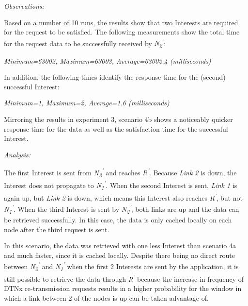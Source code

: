 \documentclass[a4paper,12pt]{report}      %
\begin{document}
\vspace*{1\baselineskip}\noindent\emph{Observations:}

Based on a number of 10 runs, the results show that two Interests are required for the request to be
satisfied. The following measurements show the total time for the request data to be successfully
received by \emph{N\textsubscript{2}\textsuperscript{'}}:

\begin{center}\textsl{Minimum=63002, Maximum=63003, Average=63002.4 (milliseconds)}\end{center}

In addition, the following times identify the response time for the (second) successful Interest:

\begin{center}\textsl{Minimum=1, Maximum=2, Average=1.6 (milliseconds)}\end{center}

Mirroring the results in experiment 3, scenario 4b shows a noticeably quicker response time for the data as well as the satisfaction time for the successful Interest.

\vspace*{1\baselineskip}\noindent\emph{Analysis:}

The first Interest is sent from \emph{N\textsubscript{2}\textsuperscript{'}} and reaches \emph{R\textsuperscript{'}}. Because \emph{Link 2} is down, the Interest does not propagate to \emph{N\textsubscript{1}\textsuperscript{'}}. When the second Interest is sent, \emph{Link 1} is again up, but \emph{Link 2} is down, which means this Interest also reaches \emph{R\textsuperscript{'}}, but not \emph{N\textsubscript{1}\textsuperscript{'}}. When the third Interest is sent by \emph{N\textsubscript{2}\textsuperscript{'}}, both links are up and the data can be retrieved successfully. In this case, the data is only cached locally on each node after the third request is sent.

In this scenario, the data was retrieved with one less Interest than scenario 4a and much faster, since it is cached locally. Despite there being no direct route between \emph{N\textsubscript{2}\textsuperscript{'}} and \emph{N\textsubscript{1}\textsuperscript{'}} when the first 2 Interests are sent by the application, it is still possible to retrieve the data through \emph{R\textsuperscript{'}} because the increase in frequency of DTNx re-transmission requests results in a higher probability for the window in which a link between 2 of the nodes is up can be taken advantage of.
\end{document}
